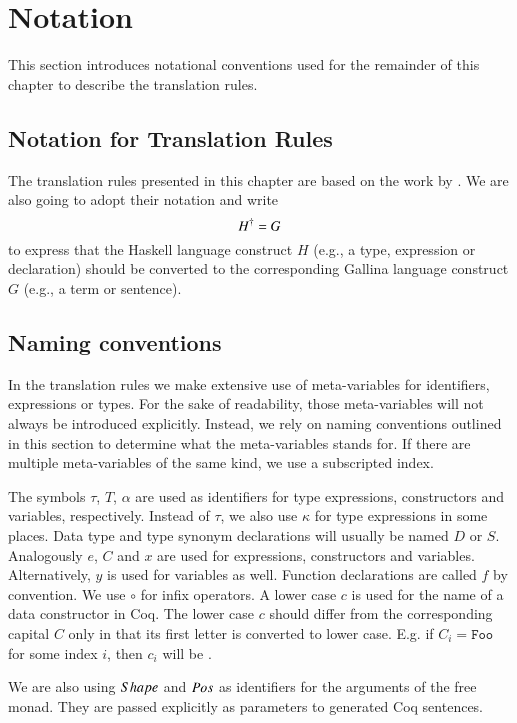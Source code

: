 \section{Notation} \label{sec:preliminaries:notation}
This section introduces notational conventions used for the remainder of this chapter to describe the translation rules.

\subsection{Notation for Translation Rules}
The translation rules presented in this chapter are based on the work by \cite{Abel:2005}.
We are also going to adopt their notation and write
\[
  {H}^{\dagger} = G
\]
to express that the Haskell language construct $H$ (e.g., a type, expression or declaration) should be converted to the corresponding Gallina language construct $G$ (e.g., a term or sentence).

\subsection{Naming conventions}
In the translation rules we make extensive use of meta-variables for identifiers, expressions or types.
For the sake of readability, those meta-variables will not always be introduced explicitly.
Instead, we rely on naming conventions outlined in this section to determine what the meta-variables stands for.
If there are multiple meta-variables of the same kind, we use a subscripted index.

The symbols $\tau$, $T$, $\alpha$ are used as identifiers for type expressions, constructors and variables, respectively.
Instead of $\tau$, we also use $\kappa$ for type expressions in some places.
Data type and type synonym declarations will usually be named $D$ or $S$.
Analogously $e$, $C$ and $x$ are used for expressions, constructors and variables.
Alternatively, $y$ is used for variables as well.
Function declarations are called $f$ by convention.
We use $\circ$ for infix operators.
A lower case $c$ is used for the name of a data constructor in Coq.
The lower case $c$ should differ from the corresponding capital $C$ only in that its first letter is converted to lower case.
E.g. if $C_i = \texttt{Foo}$ for some index $i$, then $c_i$ will be .

We are also using $Shape$ and $Pos$ as identifiers for the arguments of the free monad.
They are passed explicitly as parameters to generated Coq sentences.


